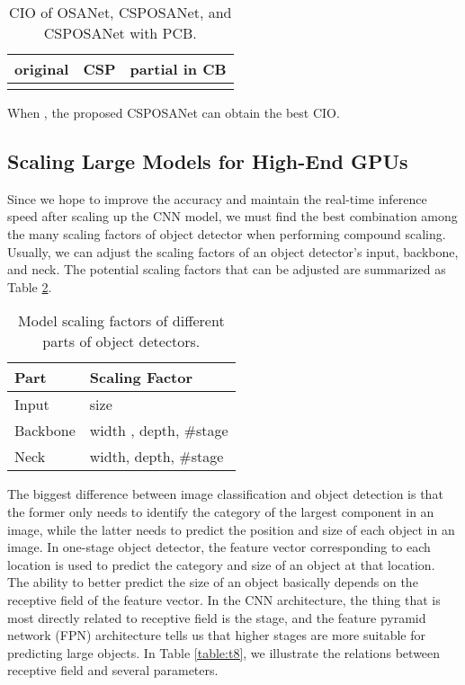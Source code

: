 \documentclass[10pt,twocolumn,letterpaper]{article}
\begin{document}
\begin{table}[h]
	\centering
	\begin{threeparttable}[h]
		\footnotesize
		\caption{CIO of OSANet, CSPOSANet, and CSPOSANet with PCB.}
		\label{table:t6}
		\setlength\tabcolsep{3.5pt}
		\begin{tabular}{lll}
			\toprule
			\textbf{original} & \textbf{CSP} & \textbf{partial in CB} \\				
			\midrule
			 &  &  \\
			\bottomrule
		\end{tabular}
	\end{threeparttable}
\end{table}

When , the proposed CSPOSANet can obtain the best CIO.

\subsection{Scaling Large Models for High-End GPUs}
\label{ss:lp}

Since we hope to improve the accuracy and maintain the real-time inference speed after scaling up the CNN model, we must find the best combination among the many scaling factors of object detector when performing compound scaling.  Usually, we can adjust the scaling factors of an object detector’s input, backbone, and neck.  The potential scaling factors that can be adjusted are summarized as Table \ref{table:t7}.

\begin{table}[h]
	\centering
	\begin{threeparttable}[h]
		\footnotesize
		\caption{Model scaling factors of different parts of object detectors.}
		\label{table:t7}
		\setlength\tabcolsep{3.5pt}
		\begin{tabular}{ll}
			\toprule
			\textbf{Part} & \textbf{Scaling Factor} \\				
			\midrule
			Input & size \\
			Backbone & width , depth, \#stage \\
			Neck & width, depth, \#stage  \\
			\bottomrule
		\end{tabular}
	\end{threeparttable}
\end{table}

The biggest difference between image classification and object detection is that the former only needs to identify the category of the largest component in an image, while the latter needs to predict the position and size of each object in an image.  In one-stage object detector, the feature vector corresponding to each location is used to predict the category and size of an object at that location.  The ability to better predict the size of an object basically depends on the receptive field of the feature vector.  In the CNN architecture, the thing that is most directly related to receptive field is the stage, and the feature pyramid network (FPN) architecture tells us that higher stages are more suitable for predicting large objects.  In Table \ref{table:t8}, we illustrate the relations between receptive field and several parameters.
\end{document}
